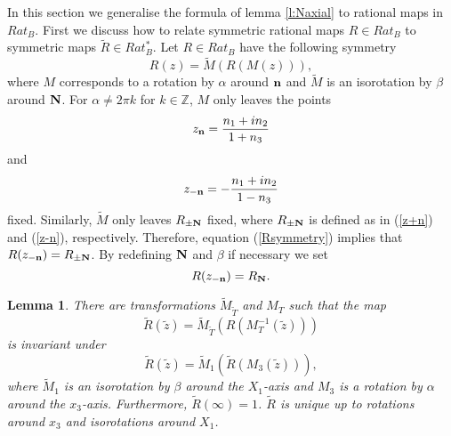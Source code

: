 \documentclass[a4paper,12pt]{article}
\newtheorem {lemma}[theorem]{Lemma}
\begin{document}
In this section we generalise the formula of lemma \ref{l:Naxial} to 
rational maps in $Rat_B$. 
First we discuss how to relate symmetric rational maps $R 
\in Rat_B$ to symmetric maps ${\tilde R} \in Rat_B^*$. Let $R \in 
Rat_B$ have the following symmetry
%
\begin{equation}
\label{Rsymmetry}
R(z) = {\tilde M} \left(R \left( M(z) \right) \right),
\end{equation}
%
where $M$ corresponds to a rotation by $\alpha$ around ${\bf n}$ and 
${\tilde M}$ is an isorotation by $\beta$ around ${\bf N}$. 
For $\alpha \neq 2 \pi k$ for $k \in {\mathbb Z}$, $M$ only leaves the 
points
%
\begin{equation}
\label{z+n}
z_{{\bf n}} = \frac{n_1 + i n_2}{1 + n_3} 
\end{equation}
%
and
%
\begin{equation}
\label{z-n}
z_{-{\bf n}} = - \frac{n_1 + i n_2}{1 - n_3}
\end{equation}
%
fixed. Similarly, ${\tilde M}$ only leaves $R_{\pm{\bf N}}$ fixed, where
$R_{\pm{\bf N}}$ is defined as in (\ref{z+n}) and (\ref{z-n}),
respectively.
Therefore, equation (\ref{Rsymmetry}) implies that $R(z_{-{\bf n}}) = 
R_{\pm {\bf N}}$. By redefining ${\bf N}$ and $\beta$ if necessary we set  
%
\begin{equation}
R(z_{-{\bf n}}) = R_{{\bf N}}.
\end{equation}
%
\begin{lemma}
\label{l:Rat}
There are transformations ${\tilde M}_{\tilde T}$ and $M_T$ such that the 
map 
%
\begin{equation}
{\tilde R} ({\tilde z}) = {\tilde M}_{\tilde T} (R 
(M_T^{-1} ({\tilde z})))
\end{equation}
%
is invariant under
% 
\begin{equation}
\label{M1M3trafo}
{\tilde R}( {\tilde z}) = {\tilde M}_1 ({\tilde R} (M_3 ({\tilde z}))),
\end{equation}
%
where ${\tilde M}_1$ is an isorotation by $\beta$ around the $X_1$-axis 
and $M_3$ is a rotation by $\alpha$ around the $x_3$-axis. Furthermore, 
${\tilde R}(\infty) = 1$. 
${\tilde R}$ is unique up to rotations around $x_3$ 
and isorotations around $X_1$.
\end{lemma}
\end{document}
